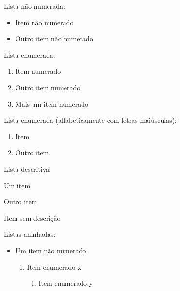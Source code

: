 \documentclass{article}
\begin{document}
Lista não numerada:
\begin{itemize}
	\item Item não numerado
	\item Outro item não numerado
\end{itemize}

Lista enumerada:
\begin{enumerate}
	\item Item numerado
	\item Outro item numerado
	\item Mais um item numerado
\end{enumerate}

Lista enumerada (alfabeticamente com letras maiúsculas):
\begin{enumerate}[label=\Alph*]
	\item Item
	\item Outro item
\end{enumerate}

Lista descritiva:
\begin{description}
	\item [Item] Um item
	\item [Outro item] Outro item
	\item Item sem descrição
\end{description}

Listas aninhadas:
\begin{itemize}
	\item Um item não numerado
	\begin{enumerate}
		\item Item enumerado-x
		\begin{enumerate}
			\item Item enumerado-y
		\end{enumerate}
	\end{enumerate}
\end{itemize}
	
\end{document}
